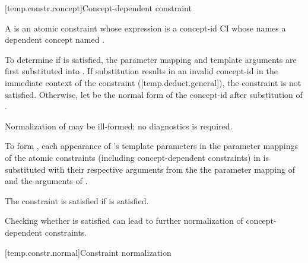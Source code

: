 \documentclass{wg21}
\begin{document}

\begin{addedblock}


[temp.constr.concept]{Concept-dependent constraint}

A   is an atomic constraint whose
expression is a concept-id CI whose  names a dependent concept named .

To determine if  is satisfied, the parameter mapping and template arguments are first substituted into . If substitution results in an invalid concept-id in the immediate context of the constraint ([temp.deduct.general]), the constraint is not satisfied.
Otherwise, let  be the normal form of the concept-id after substitution of .

\begin{note}
Normalization of  may be ill-formed; no diagnostics is required.
\end{note}

To form , each appearance of 's template parameters in the parameter mappings of the atomic constraints (including concept-dependent constraints) in  is substituted with their respective arguments from the
the parameter mapping of  and the arguments of .

%

The constraint is satisfied if  is satisfied.

\begin{note}
Checking whether  is satisfied can lead to further
normalization of concept-dependent constraints.
\end{note}


\end{addedblock}

[temp.constr.normal]{Constraint normalization}
%

%
\end{document}
